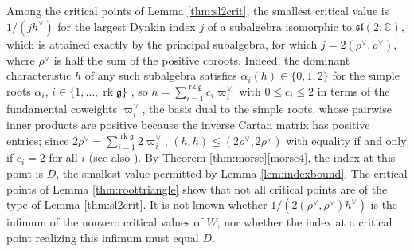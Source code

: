 \documentclass [leqno, 10pt]{amsart}
\theoremstyle{definition}
\numberwithin{equation}{section}
\newcommand{\al}{\alpha}
\newcommand{\sll}{\mathfrak{sl}}
\newcommand{\g}{\mathfrak{g}}
\newcommand{\com}{\mathbb C}
\newcommand{\hv}{h^\vee}
\begin{document}
\begin{remark}\label{rem:minimalvalue}
Among the critical points of Lemma \ref{thm:sl2crit}, the smallest critical value is $1/(j\hv)$ for the largest Dynkin index $j$ of a subalgebra isomorphic to $\sll(2, \com)$, which is attained exactly by the principal subalgebra, for which $j = 2(\rho^{\vee}, \rho^{\vee})$, where $\rho^{\vee}$ is half the sum of the positive coroots. Indeed, the dominant characteristic $h$ of any such subalgebra satisfies $\al_{i}(h) \in \{0, 1, 2\}$ for the simple roots $\al_{i}$, $i \in \{1, \dots, \operatorname{rk}\g\}$ \cite[Section~3.5]{Collingwood-McGovern}, so $h = \sum_{i=1}^{\operatorname{rk}\g}c_{i}\varpi_{i}^{\vee}$ with $0 \leq c_{i} \leq 2$ in terms of the fundamental coweights $\varpi_{i}^{\vee}$, the basis dual to the simple roots, whose pairwise inner products are positive because the inverse Cartan matrix has positive entries; since $2\rho^{\vee} = \sum_{i=1}^{\operatorname{rk}\g}2\varpi_{i}^{\vee}$, $(h, h) \leq (2\rho^{\vee}, 2\rho^{\vee})$ with equality if and only if $c_{i} = 2$ for all $i$ (see also \cite{Panyushev-dynkinindex}). By Theorem \ref{thm:morse}\ref{morse4}, the index at this point is $D$, the smallest value permitted by Lemma \ref{lem:indexbound}. The critical points of Lemma \ref{thm:roottriangle} show that not all critical points are of the type of Lemma \ref{thm:sl2crit}. It is not known whether $1/(2(\rho^{\vee}, \rho^{\vee})\hv)$ is the infimum of the nonzero critical values of $W$, nor whether the index at a critical point realizing this infimum must equal $D$.
\end{remark}
\end{document}
